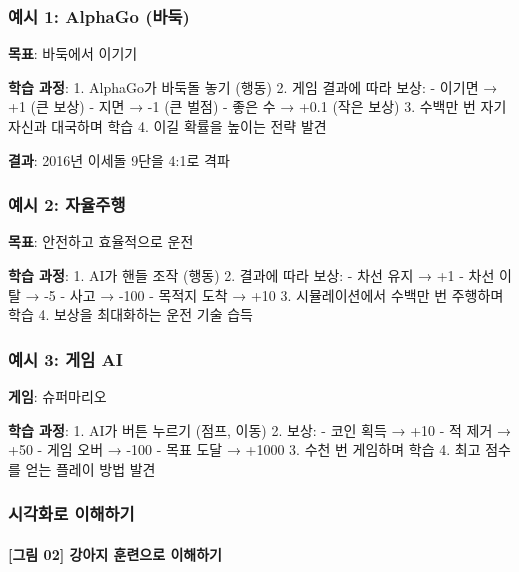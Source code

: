 \documentclass[a4paper, 11pt]{article}
\begin{document}
\hypertarget{uxc608uxc2dc-1-alphago-uxbc14uxb451}{%
\subsubsection{예시 1: AlphaGo
(바둑)}\label{uxc608uxc2dc-1-alphago-uxbc14uxb451}}

\textbf{목표}: 바둑에서 이기기

\textbf{학습 과정}: 1. AlphaGo가 바둑돌 놓기 (행동) 2. 게임 결과에 따라
보상: - 이기면 → +1 (큰 보상) - 지면 → -1 (큰 벌점) - 좋은 수 → +0.1
(작은 보상) 3. 수백만 번 자기 자신과 대국하며 학습 4. 이길 확률을 높이는
전략 발견

\textbf{결과}: 2016년 이세돌 9단을 4:1로 격파

\hypertarget{uxc608uxc2dc-2-uxc790uxc728uxc8fcuxd589}{%
\subsubsection{예시 2:
자율주행}\label{uxc608uxc2dc-2-uxc790uxc728uxc8fcuxd589}}

\textbf{목표}: 안전하고 효율적으로 운전

\textbf{학습 과정}: 1. AI가 핸들 조작 (행동) 2. 결과에 따라 보상: - 차선
유지 → +1 - 차선 이탈 → -5 - 사고 → -100 - 목적지 도착 → +10 3.
시뮬레이션에서 수백만 번 주행하며 학습 4. 보상을 최대화하는 운전 기술
습득

\hypertarget{uxc608uxc2dc-3-uxac8cuxc784-ai}{%
\subsubsection{예시 3: 게임 AI}\label{uxc608uxc2dc-3-uxac8cuxc784-ai}}

\textbf{게임}: 슈퍼마리오

\textbf{학습 과정}: 1. AI가 버튼 누르기 (점프, 이동) 2. 보상: - 코인
획득 → +10 - 적 제거 → +50 - 게임 오버 → -100 - 목표 도달 → +1000 3.
수천 번 게임하며 학습 4. 최고 점수를 얻는 플레이 방법 발견

\hypertarget{uxc2dcuxac01uxd654uxb85c-uxc774uxd574uxd558uxae30}{%
\subsubsection{시각화로
이해하기}\label{uxc2dcuxac01uxd654uxb85c-uxc774uxd574uxd558uxae30}}

\hypertarget{uxadf8uxb9bc-19-uxac15uxc544uxc9c0-uxd6c8uxb828uxc73cuxb85c-uxc774uxd574uxd558uxae30}{%
\paragraph{\texorpdfstring{\textbf{{[}그림 02{]} 강아지 훈련으로
이해하기}
}{{[}그림 02{]} 강아지 훈련으로 이해하기 }}\label{uxadf8uxb9bc-19-uxac15uxc544uxc9c0-uxd6c8uxb828uxc73cuxb85c-uxc774uxd574uxd558uxae30}}
\end{document}
